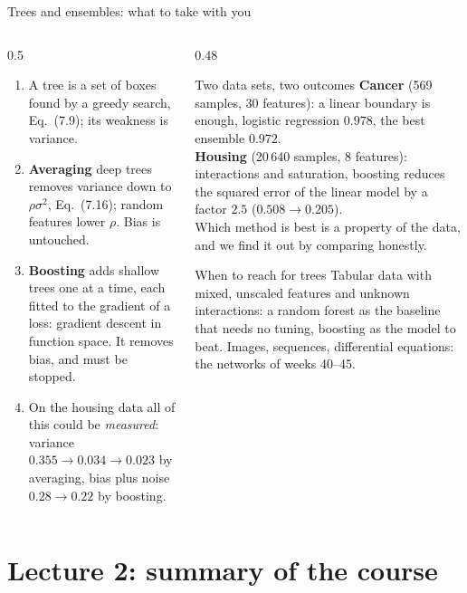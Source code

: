 \documentclass[10pt,aspectratio=169]{beamer}
\begin{document}
\begin{frame}{Trees and ensembles: what to take with you}
\begin{columns}[T]
\begin{column}{0.5\textwidth}
\small
\begin{enumerate}
  \item A tree is a set of boxes found by a greedy search, Eq.\ (7.9); its
    weakness is variance.
  \item \textbf{Averaging} deep trees removes variance down to
    $\rho\sigma^2$, Eq.\ (7.16); random features lower $\rho$.  Bias is
    untouched.
  \item \textbf{Boosting} adds shallow trees one at a time, each fitted to
    the gradient of a loss: gradient descent in function space.  It removes
    bias, and must be stopped.
  \item On the housing data all of this could be \emph{measured}: variance
    $0.355\to0.034\to0.023$ by averaging, bias plus noise $0.28\to0.22$ by
    boosting.
\end{enumerate}
\end{column}
\begin{column}{0.48\textwidth}
\small
\begin{block}{Two data sets, two outcomes}
\footnotesize
\textbf{Cancer} (569 samples, 30 features): a linear boundary is enough,
logistic regression $0.978$, the best ensemble $0.972$.\\[2pt]
\textbf{Housing} (20\,640 samples, 8 features): interactions and
saturation, boosting reduces the squared error of the linear model by a
factor $2.5$ ($0.508\to0.205$).\\[2pt]
Which method is best is a property of the data, and we find it out by
comparing honestly.
\end{block}
\begin{block}{When to reach for trees}
\footnotesize
Tabular data with mixed, unscaled features and unknown interactions: a
random forest as the baseline that needs no tuning, boosting as the model
to beat.  Images, sequences, differential equations: the networks of weeks
40--45.
\end{block}
\end{column}
\end{columns}
\end{frame}

\section{Lecture 2: summary of the course}
\end{document}

